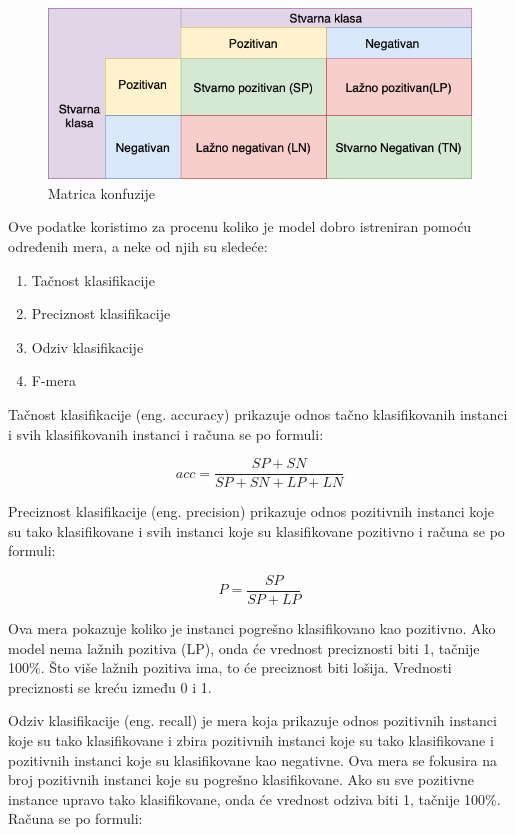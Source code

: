 \documentclass[12pt,oneside]{memoir}
\begin{document}
\begin{figure}[h!]
\centering
\includegraphics[width=.7\textwidth]{images/confusionMatrix.png}
\caption{Matrica konfuzije}
\label{img:confusionMatrix}
\end{figure}

Ove podatke koristimo za procenu koliko je model dobro istreniran pomoću određenih mera, a neke od njih su sledeće:

\begin{enumerate}
\item Tačnost klasifikacije
\item Preciznost klasifikacije
\item Odziv klasifikacije
\item F-mera
\end{enumerate}

Tačnost klasifikacije (eng. accuracy) prikazuje odnos tačno klasifikovanih instanci i svih klasifikovanih instanci i računa se po formuli:

\begin{equation}
	acc = \frac{SP+SN}{SP+SN+LP+LN}
\end{equation}

Preciznost klasifikacije (eng. precision) prikazuje odnos pozitivnih instanci koje su tako klasifikovane i svih instanci koje su klasifikovane pozitivno i računa se po formuli:

\begin{equation}
	P = \frac{SP}{SP+LP}
\end{equation}

Ova mera pokazuje koliko je instanci pogrešno klasifikovano kao pozitivno. Ako model nema lažnih pozitiva (LP), onda će vrednost preciznosti biti 1, tačnije 100\%. Što više lažnih pozitiva ima, to će preciznost biti lošija. Vrednosti preciznosti se kreću između 0 i 1.

Odziv klasifikacije (eng. recall) je mera koja prikazuje odnos pozitivnih instanci koje su tako klasifikovane i zbira pozitivnih instanci koje su tako klasifikovane i pozitivnih instanci koje su klasifikovane kao negativne. Ova mera se fokusira na broj pozitivnih instanci koje su pogrešno klasifikovane. Ako su sve pozitivne instance upravo tako klasifikovane, onda će vrednost odziva biti 1, tačnije 100\%. Računa se po formuli:
\end{document}
